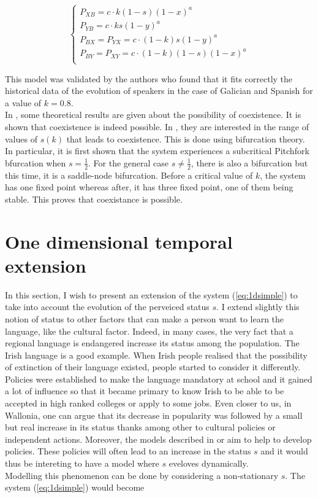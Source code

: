 \documentclass{article}
\begin{document}
\[
\begin{cases}
P_{XB} = c \cdot k (1-s) (1-x)^a \\
P_{YB} = c \cdot k s (1-y)^a \\
P_{BX} = P_{YX} = c \cdot (1-k) s (1-y)^a \\
P_{BY} = P_{XY} = c \cdot (1-k) (1-s) (1-x)^a \\
\end{cases}
\]

This model was validated by the authors who found that it fits correctly the historical data of the evolution of speakers in the case of Galician and Spanish for a value of $k = 0.8$. \\
In \cite{BAGGS19939}, some theoretical results are given about the possibility of coexistence. It is shown that coexistence is indeed possible. In \cite{bilingual}, they are interested in the range of values of $s(k)$ that leads to coexistence. This is done using bifurcation theory. In particular, it is first shown that the system experiences a subcritical Pitchfork bfurcation when $s = \frac{1}{2}$. For the general case $s \ne \frac{1}{2}$, there is also a bifurcation but this time, it is a saddle-node bifurcation. Before a critical value of $k$, the system has one fixed point whereas after, it has three fixed point, one of them being stable. This proves that coexistance is possible.

\section{One dimensional temporal extension}
\label{sec:1d}
In this section, I wish to present an extension of the system (\ref{eq:1dsimple}) to take into account the evolution of the perveiced status $s$.
I extend slightly this notion of status to other factors that can make a person want to learn the language, like the cultural factor.
Indeed, in many cases, the very fact that a regional language is endangered increase its status among the population.
The Irish language is a good example.
When Irish people realised that the possibility of extinction of their language existed, people started to consider it differently.
Policies were established to make the language mandatory at school and it gained a lot of influence so that it became primary to know Irish to be able to be accepted in high ranked colleges or apply to some jobs.
Even closer to us, in Wallonia, one can argue that its decrease in popularity was followed by a small but real increase in its status thanks among other to cultural policies or independent actions.
Moreover, the models described in \cite{death} or \cite{bilingual} aim to help to develop policies.
These policies will often lead to an increase in the status $s$ and it would thus be intereting to have a model where $s$ eveloves dynamically. \\
Modelling this phenomenon can be done by considering a non-stationary $s$. The system (\ref{eq:1dsimple}) would become
\end{document}
